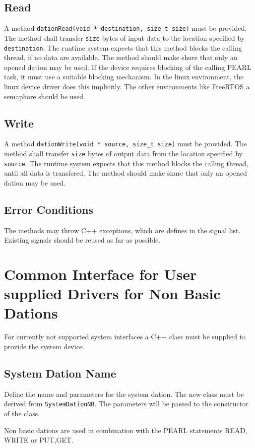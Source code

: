 \subsection{Read}
A method \verb|dationRead(void * destination, size_t size)|
must be provided. The method shall transfer \verb|size| bytes of
input data to the location specified by \verb|destination|.
The runtime system expects that this method blocks the calling thread,
if no data are available.
The method should make shure that only an opened dation may be used.
If the device requires blocking of the calling PEARL task, it 
must use a suitable blocking mechanism. In the linux environment,
the linux device driver does this implicitly. 
The other environments like FreeRTOS a semaphore should be used.


\subsection{Write}
A method \verb|dationWrite(void * source, size_t size)|
must be provided. The method shall transfer \verb|size| bytes of
output data from the location specified by \verb|source|.
The runtime system expects that this method blocks the calling thread,
until all data is transfered.
The method should make shure that only an opened dation may be used.

\subsection{Error Conditions}
The methods may throw C++ exceptions, which are defines in the signal list.
Existing signals should be reused as far as possible.

\section{Common Interface for User supplied Drivers for Non Basic Dations}
For currently not supported system interfaces a C++ class must be supplied to 
provide the system device.

\subsection{System Dation Name}
Define the name and parameters for the system dation.
The new class must be derived from \verb|SystemDationNB|.
The parameters will be passed to the constructor of the class.

Non basic dations are used in combination with the PEARL statements READ, WRITE
or PUT,GET. 

